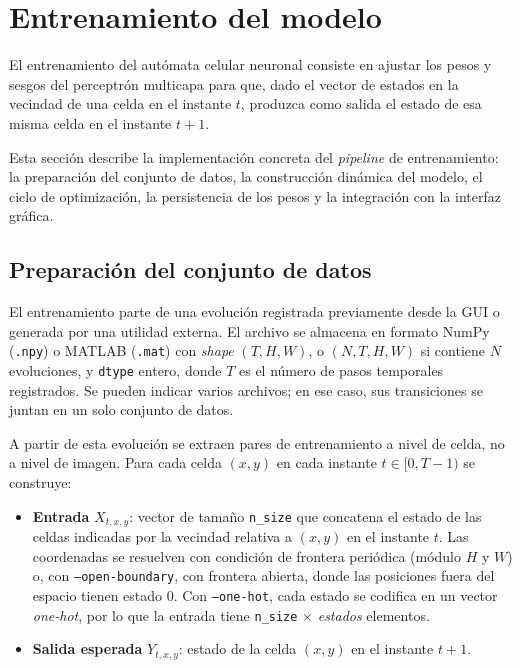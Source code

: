 \section{Entrenamiento del modelo}

El entrenamiento del autómata celular neuronal consiste en ajustar los pesos y sesgos del perceptrón multicapa para que, dado el vector de estados en la vecindad de una celda en el instante $t$, produzca como salida el estado de esa misma celda en el instante $t+1$. 

Esta sección describe la implementación concreta del \textit{pipeline} de entrenamiento: la preparación del conjunto de datos, la construcción dinámica del modelo, el ciclo de optimización, la persistencia de los pesos y la integración con la interfaz gráfica.

\subsection{Preparación del conjunto de datos}

El entrenamiento parte de una evolución registrada previamente desde la GUI o generada por una utilidad externa. El archivo se almacena en formato NumPy (\texttt{.npy}) o MATLAB (\texttt{.mat}) con \textit{shape} $(T, H, W)$, o $(N, T, H, W)$ si contiene $N$ evoluciones, y \texttt{dtype} entero, donde $T$ es el número de pasos temporales registrados. Se pueden indicar varios archivos; en ese caso, sus transiciones se juntan en un solo conjunto de datos.

A partir de esta evolución se extraen pares de entrenamiento a nivel de celda, no a nivel de imagen. Para cada celda $(x, y)$ en cada instante $t \in [0, T-1)$ se construye:

\begin{itemize}
    \item \textbf{Entrada} $X_{t,x,y}$: vector de tamaño \texttt{n\_size} que concatena el estado de las celdas indicadas por la vecindad relativa a $(x, y)$ en el instante $t$. Las coordenadas se resuelven con condición de frontera periódica (módulo $H$ y $W$) o, con \texttt{--open-boundary}, con frontera abierta, donde las posiciones fuera del espacio tienen estado 0. Con \texttt{--one-hot}, cada estado se codifica en un vector \textit{one-hot}, por lo que la entrada tiene \texttt{n\_size} $\times$ \textit{estados} elementos.
    \item \textbf{Salida esperada} $Y_{t,x,y}$: estado de la celda $(x, y)$ en el instante $t+1$.
\end{itemize}

